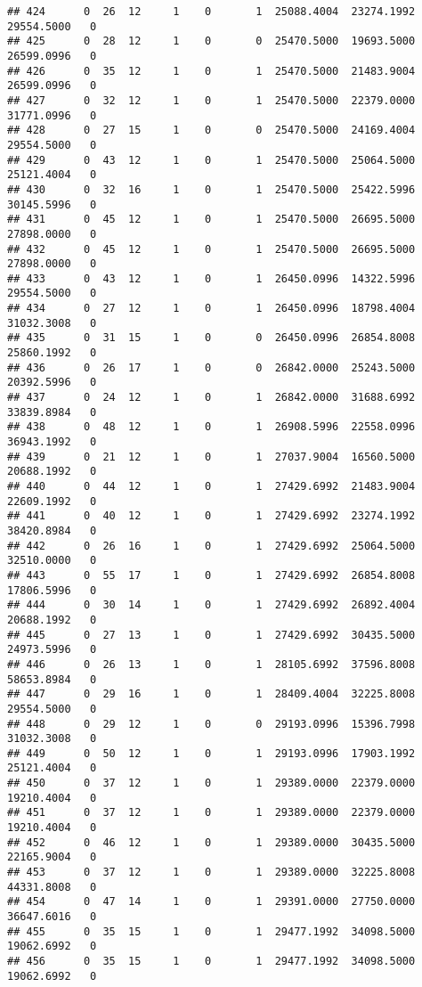 \documentclass[
]{article}
\begin{document}
\begin{enumerate}
\begin{verbatim}
## 424      0  26  12     1    0       1  25088.4004  23274.1992  29554.5000   0
## 425      0  28  12     1    0       0  25470.5000  19693.5000  26599.0996   0
## 426      0  35  12     1    0       1  25470.5000  21483.9004  26599.0996   0
## 427      0  32  12     1    0       1  25470.5000  22379.0000  31771.0996   0
## 428      0  27  15     1    0       0  25470.5000  24169.4004  29554.5000   0
## 429      0  43  12     1    0       1  25470.5000  25064.5000  25121.4004   0
## 430      0  32  16     1    0       1  25470.5000  25422.5996  30145.5996   0
## 431      0  45  12     1    0       1  25470.5000  26695.5000  27898.0000   0
## 432      0  45  12     1    0       1  25470.5000  26695.5000  27898.0000   0
## 433      0  43  12     1    0       1  26450.0996  14322.5996  29554.5000   0
## 434      0  27  12     1    0       1  26450.0996  18798.4004  31032.3008   0
## 435      0  31  15     1    0       0  26450.0996  26854.8008  25860.1992   0
## 436      0  26  17     1    0       0  26842.0000  25243.5000  20392.5996   0
## 437      0  24  12     1    0       1  26842.0000  31688.6992  33839.8984   0
## 438      0  48  12     1    0       1  26908.5996  22558.0996  36943.1992   0
## 439      0  21  12     1    0       1  27037.9004  16560.5000  20688.1992   0
## 440      0  44  12     1    0       1  27429.6992  21483.9004  22609.1992   0
## 441      0  40  12     1    0       1  27429.6992  23274.1992  38420.8984   0
## 442      0  26  16     1    0       1  27429.6992  25064.5000  32510.0000   0
## 443      0  55  17     1    0       1  27429.6992  26854.8008  17806.5996   0
## 444      0  30  14     1    0       1  27429.6992  26892.4004  20688.1992   0
## 445      0  27  13     1    0       1  27429.6992  30435.5000  24973.5996   0
## 446      0  26  13     1    0       1  28105.6992  37596.8008  58653.8984   0
## 447      0  29  16     1    0       1  28409.4004  32225.8008  29554.5000   0
## 448      0  29  12     1    0       0  29193.0996  15396.7998  31032.3008   0
## 449      0  50  12     1    0       1  29193.0996  17903.1992  25121.4004   0
## 450      0  37  12     1    0       1  29389.0000  22379.0000  19210.4004   0
## 451      0  37  12     1    0       1  29389.0000  22379.0000  19210.4004   0
## 452      0  46  12     1    0       1  29389.0000  30435.5000  22165.9004   0
## 453      0  37  12     1    0       1  29389.0000  32225.8008  44331.8008   0
## 454      0  47  14     1    0       1  29391.0000  27750.0000  36647.6016   0
## 455      0  35  15     1    0       1  29477.1992  34098.5000  19062.6992   0
## 456      0  35  15     1    0       1  29477.1992  34098.5000  19062.6992   0

\end{verbatim}
\end{enumerate}
\end{document}
